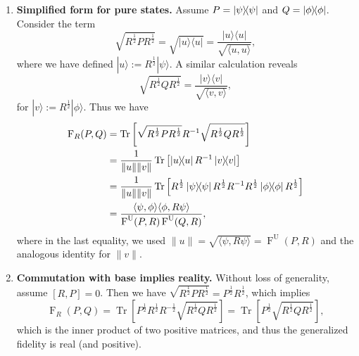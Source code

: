 \documentclass[12pt]{article}
\theoremstyle{definition}
\newcommand{\Fu}[2]{\operatorname{F}^\mathrm{U}\!\left(#1, #2\right)}
\begin{document}
\begin{enumerate}[noitemsep, left=0pt]
    \item \textbf{Simplified form for pure states.} Assume $P = \ketbra{\psi}$ and $Q = \ketbra{\phi}$. Consider the term
    \begin{equation}
        \sqrt{R^{\frac12}  P R ^{\frac12} } = \sqrt{|u \rangle \langle u|} = \frac{|u \rangle \langle u|}{\sqrt{\langle u, u \rangle }},
    \end{equation}
     where we have defined $|u \rangle := R^{\frac12} |\psi \rangle $. A similar calculation reveals
     \begin{equation}
        \sqrt{R ^{\frac12} Q R ^{\frac12} } = \frac{|v \rangle \langle v|}{\sqrt{\langle v, v \rangle }},
     \end{equation} 
    for $|v \rangle := R ^{\frac12} | \phi \rangle$. Thus we have
    \begin{equation}
    \begin{aligned}
        \operatorname{F}_R(P,Q) & =
        \operatorname{Tr}\left[\sqrt{ R^{\frac12} P R^{\frac12}} R^{-1}\sqrt{ R^{\frac12} Q R^{\frac12}}  \right] \\  &= \frac{1}{\|u\| \|v\|} \operatorname{Tr}\left[\ketbra{u} R ^{-1} \ketbra{v} \right] \\ &= 
        \frac{1}{\|u\| \|v\|} \operatorname{Tr}\left[R ^{\frac12} \ketbra{\psi} R ^{\frac12}  R ^{-1} R ^{\frac12} \ketbra{\phi} R ^{\frac12} \right] \\
        &= \frac{\langle \psi, \phi \rangle \langle \phi, R \psi \rangle }{ \Fu{P}{R} \Fu{Q}{R}}, 
    \end{aligned}
    \end{equation}
    where in the last equality, we used $\|u\| = \sqrt{\langle \psi, R \psi \rangle} = \Fu{P}{R}$ and the analogous identity for $\|v\|$.

     
    \item \textbf{Commutation with base implies reality.} Without loss of generality, assume $[R,P] = 0$. Then we have $\sqrt{R ^{\frac12} P R ^{\frac12} } = P^{\frac12}  R ^{\frac12} $, which implies
    \begin{equation}
        \operatorname{F}_R(P,Q) = \operatorname{Tr}\left[P^{\frac12}  R ^{\frac12} R^{-\frac12} \sqrt{R ^{\frac12} Q R ^{\frac12} } \right] = \operatorname{Tr}\left[P^{\frac12}  \sqrt{R ^{\frac12} Q R ^{\frac12} } \right],
    \end{equation}
    which is the inner product of two positive matrices, and thus the generalized fidelity is real (and positive).


\end{enumerate}
\end{document}
